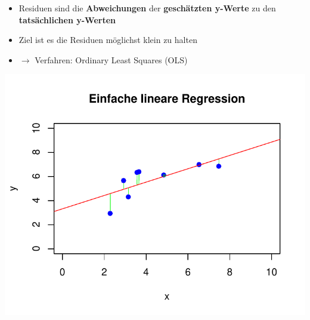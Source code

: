 \documentclass[aspectratio=169, journal, x11names, unknownkeysallowed, hyperref={colorlinks,
linkcolor = SS2,
urlcolor  = F3,
citecolor = F3,
anchorcolor = A4}, 12pt]{beamer}
\newcommand{\oarrow}{\textcolor{A1}{$\rightarrow$} }
\begin{document}
\begin{frame}[t]
  \begin{minipage}[t]{0.45\textwidth}
    \vspace{-11.5em}
    \begin{itemize}
      \item Residuen sind die \textbf{Abweichungen} der \textbf{geschätzten y-Werte} zu den \textbf{tatsächlichen y-Werten} 
      \item Ziel ist es die Residuen möglichst klein zu halten
      \item[] \oarrow Verfahren: Ordinary Least Squares (OLS)
    \end{itemize}
\end{minipage}%
\begin{minipage}[t]{0.45\textwidth}
  \centering
  \includegraphics[scale=0.5]{../Plots/reg_lin_4.pdf}
\end{minipage}
\end{frame}
\end{document}
